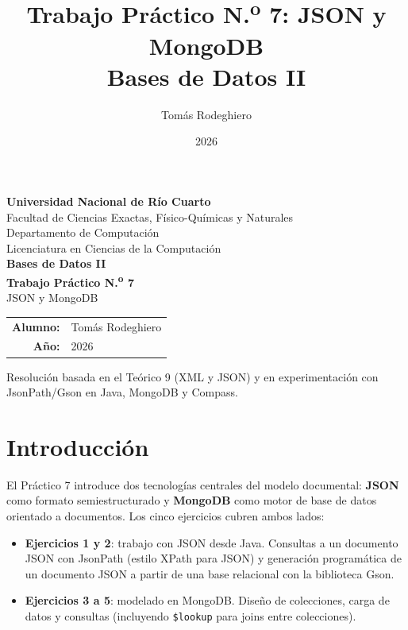 \documentclass[11pt,a4paper]{article}
\title{Trabajo Práctico N.\textsuperscript{o} 7: JSON y MongoDB\\[4pt]
       \large Bases de Datos II}
\author{Tomás Rodeghiero}
\date{2026}
\begin{document}
\begin{titlepage}
    \centering
    \vspace*{1.5cm}

    {\large \textbf{Universidad Nacional de Río Cuarto}}\\[6pt]
    {\normalsize Facultad de Ciencias Exactas, Físico-Químicas y Naturales}\\[4pt]
    {\normalsize Departamento de Computación}\\[4pt]
    {\normalsize Licenciatura en Ciencias de la Computación}\\[3cm]

    {\Large \textbf{Bases de Datos II}}\\[1.2cm]

    {\Large \textbf{Trabajo Práctico N.\textsuperscript{o} 7}}\\[6pt]
    {\large JSON y MongoDB}\\[3cm]

    \begin{tabular}{rl}
        \textbf{Alumno:} & Tomás Rodeghiero \\[4pt]
        \textbf{Año:}    & 2026 \\
    \end{tabular}

    \vfill
    {\small Resolución basada en el Teórico 9 (XML y JSON) y en experimentación con JsonPath/Gson en Java, MongoDB y Compass.}
\end{titlepage}

\tableofcontents
\newpage

\section{Introducción}

El Práctico 7 introduce dos tecnologías centrales del modelo documental: \textbf{JSON} como formato semiestructurado y \textbf{MongoDB} como motor de base de datos orientado a documentos. Los cinco ejercicios cubren ambos lados:

\begin{itemize}
    \item \textbf{Ejercicios 1 y 2}: trabajo con JSON desde Java. Consultas a un documento JSON con JsonPath (estilo XPath para JSON) y generación programática de un documento JSON a partir de una base relacional con la biblioteca Gson.
    \item \textbf{Ejercicios 3 a 5}: modelado en MongoDB. Diseño de colecciones, carga de datos y consultas (incluyendo \texttt{\$lookup} para joins entre colecciones).
\end{itemize}
\end{document}
